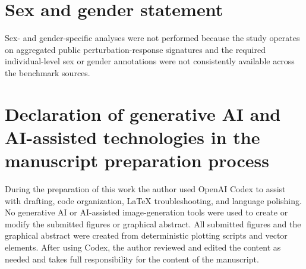 \documentclass[11pt]{article}
\begin{document}
\section*{Sex and gender statement}
Sex- and gender-specific analyses were not performed because the study operates on aggregated public perturbation-response signatures and the required individual-level sex or gender annotations were not consistently available across the benchmark sources.

\section*{Declaration of generative AI and AI-assisted technologies in the manuscript preparation process}
During the preparation of this work the author used OpenAI Codex to assist with drafting, code organization, LaTeX troubleshooting, and language polishing. No generative AI or AI-assisted image-generation tools were used to create or modify the submitted figures or graphical abstract. All submitted figures and the graphical abstract were created from deterministic plotting scripts and vector elements. After using Codex, the author reviewed and edited the content as needed and takes full responsibility for the content of the manuscript.



\end{document}
